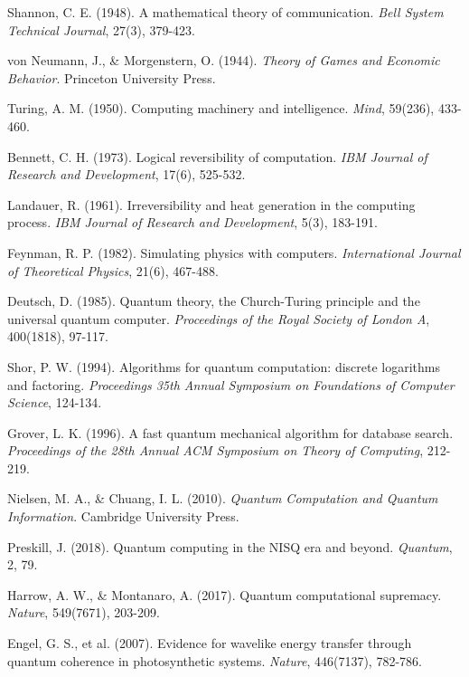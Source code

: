 \documentclass[12pt,a4paper]{article}
\begin{document}
\begin{thebibliography}{99}

Shannon, C. E. (1948). A mathematical theory of communication. \textit{Bell System Technical Journal}, 27(3), 379-423.

von Neumann, J., \& Morgenstern, O. (1944). \textit{Theory of Games and Economic Behavior}. Princeton University Press.

Turing, A. M. (1950). Computing machinery and intelligence. \textit{Mind}, 59(236), 433-460.

Bennett, C. H. (1973). Logical reversibility of computation. \textit{IBM Journal of Research and Development}, 17(6), 525-532.

Landauer, R. (1961). Irreversibility and heat generation in the computing process. \textit{IBM Journal of Research and Development}, 5(3), 183-191.

Feynman, R. P. (1982). Simulating physics with computers. \textit{International Journal of Theoretical Physics}, 21(6), 467-488.

Deutsch, D. (1985). Quantum theory, the Church-Turing principle and the universal quantum computer. \textit{Proceedings of the Royal Society of London A}, 400(1818), 97-117.

Shor, P. W. (1994). Algorithms for quantum computation: discrete logarithms and factoring. \textit{Proceedings 35th Annual Symposium on Foundations of Computer Science}, 124-134.

Grover, L. K. (1996). A fast quantum mechanical algorithm for database search. \textit{Proceedings of the 28th Annual ACM Symposium on Theory of Computing}, 212-219.

Nielsen, M. A., \& Chuang, I. L. (2010). \textit{Quantum Computation and Quantum Information}. Cambridge University Press.

Preskill, J. (2018). Quantum computing in the NISQ era and beyond. \textit{Quantum}, 2, 79.

Harrow, A. W., \& Montanaro, A. (2017). Quantum computational supremacy. \textit{Nature}, 549(7671), 203-209.

Engel, G. S., et al. (2007). Evidence for wavelike energy transfer through quantum coherence in photosynthetic systems. \textit{Nature}, 446(7137), 782-786.


\end{thebibliography}
\end{document}
